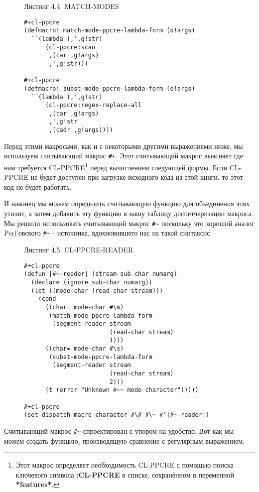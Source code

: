 \begin{figure}Листинг 4.4: MATCH-MODES\label{listing_4.4}
\listbegin
\begin{verbatim}
#+cl-ppcre
(defmacro! match-mode-ppcre-lambda-form (o!args)
  ``(lambda (,',g!str)
      (cl-ppcre:scan
       ,(car ,g!args)
       ,',g!str)))

#+cl-ppcre
(defmacro! subst-mode-ppcre-lambda-form (o!args)
  ``(lambda (,',g!str)
      (cl-ppcre:regex-replace-all
       ,(car ,g!args)
       ,',g!str
       ,(cadr ,g!args))))
\end{verbatim}
\listend
\end{figure}

Перед этими макросами, как и с некоторыми другими выражениями ниже, мы используем считывающий макрос \verb"#+". Этот считывающий макрос выясняет где нам требуется CL-PPCRE\footnote{Этот макрос определяет необходимость CL-PPCRE с помощью поиска ключевого символа \textbf{:CL-PPCRE} в списке, сохранённом в переменной \textbf{*features*}.} перед вычислением следующей формы. Если CL-PPCRE не будет доступен при загрузке исходного кода из этой книги, то этот код не будет работать.

И наконец мы можем определить считывающую функцию для объединения этих утилит, а затем добавить эту функцию в нашу таблицу диспетчеризации макроса. Мы решили использовать считывающий макрос \verb"#~" поскольку это хороший аналог Perl'овского \verb"#~" - источника, вдохновившего нас на такой синтаксис.

\begin{figure}Листинг 4.5: CL-PPCRE-READER\label{listing_4.5}
\listbegin
\begin{verbatim}
#+cl-ppcre
(defun |#~-reader| (stream sub-char numarg)
  (declare (ignore sub-char numarg))
  (let ((mode-char (read-char stream)))
    (cond
      ((char= mode-char #\m)
       (match-mode-ppcre-lambda-form
        (segment-reader stream
                        (read-char stream)
                        1)))
      ((char= mode-char #\s)
       (subst-mode-ppcre-lambda-form
        (segment-reader stream
                        (read-char stream)
                        2)))
      (t (error "Unknown #~~ mode character")))))

#+cl-ppcre
(set-dispatch-macro-character #\# #\~ #'|#~-reader|)
\end{verbatim}
\listend
\end{figure}

Считывающий макрос \verb"#~" спроектирован с упором на удобство. Вот как мы можем создать функцию, производящую сравнение с регулярным выражением:

